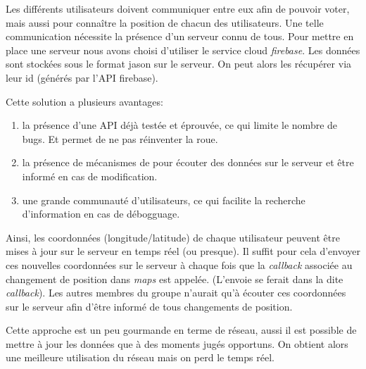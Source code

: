Les différents utilisateurs doivent communiquer entre eux afin de pouvoir voter, mais aussi pour connaître la position de chacun
des utilisateurs. Une telle communication nécessite la présence d'un serveur connu de tous. Pour mettre en place une serveur nous
avons choisi d'utiliser le service cloud \textit{firebase}. Les données sont stockées sous le format jason sur le serveur. On peut
alors les récupérer via leur id (générés par l'API firebase).
\newline

Cette solution a plusieurs avantages:
\begin{enumerate}
    \item la présence d'une API déjà testée et éprouvée, ce qui limite le nombre de bugs. Et permet de ne pas réinventer la roue.
    \item la présence de mécanismes de pour écouter des données sur le serveur et être informé en cas de modification.
    \item une grande communauté d'utilisateurs, ce qui facilite la recherche d'information en cas de débogguage.
\end{enumerate}

Ainsi, les coordonnées (longitude/latitude) de chaque utilisateur peuvent être mises à jour sur le serveur en temps réel (ou
presque). Il suffit pour cela d'envoyer ces nouvelles coordonnées sur le serveur à chaque fois que la \textit{callback} associée
au changement de position dans \textit{maps} est appelée. (L'envoie se ferait dans la dite \textit{callback}). Les autres membres
du groupe n'aurait qu'à écouter ces coordonnées sur le serveur afin d'être informé de tous changements de position.
\newline

Cette approche est un peu gourmande en terme de réseau, aussi il est possible de mettre à jour les données que à des moments jugés
opportuns. On obtient alors une meilleure utilisation du réseau mais on perd le temps réel.
